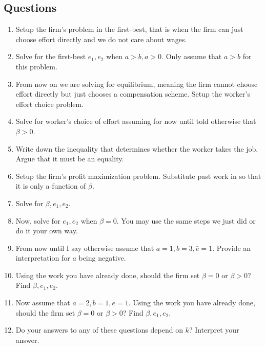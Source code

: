 \documentclass{article}
\begin{document}
\subsection{Questions}
\begin{enumerate}
    \item Setup the firm's problem in the first-best, that is when the firm can just choose effort directly and we do not care about wages.

    \item Solve for the first-best $e_1,e_2$ when $a>b, a>0$. Only assume that $a>b$ for this problem.

 \item From now on we are solving for equilibrium, meaning the firm cannot choose effort directly but just chooses a compensation scheme. Setup the worker's effort choice problem.

 \item Solve for worker's choice of effort assuming for now until told otherwise that $\beta>0$.

 \item Write down the inequality that determines whether the worker takes the job. Argue that it must be an equality.

 \item Setup the firm's profit maximization problem. Substitute past work in so that it is only a function of $\beta$.
 \item Solve for $\beta, e_1,e_2$.

 \item Now, solve for $e_1, e_2$ when $\beta=0$. You may use the same steps we just did or do it your own way.
 
    \item From now until I say otherwise assume that $a=1, b=3, \bar e=1$. Provide an interpretation for $a$ being negative.

    \item Using the work you have already done, should the firm set $\beta=0$ or $\beta>0$? Find $\beta, e_1, e_2$.

    \item Now assume that $a=2, b=1,\bar e=1$. Using the work you have already done, should the firm set $\beta=0$ or $\beta>0$? Find $\beta, e_1, e_2$.

    \item Do your answers to any of these questions depend on $k$? Interpret your answer.
\end{enumerate}
\end{document}
